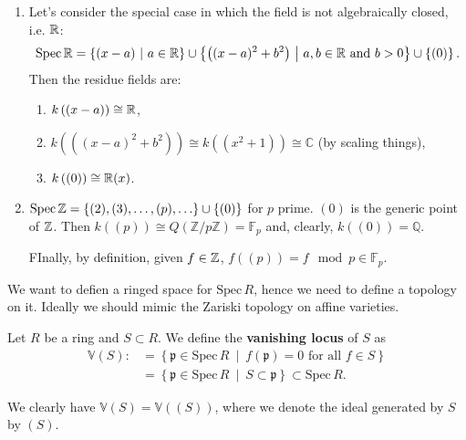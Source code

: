 \begin{ex}
\begin{enumerate}
\item Let's consider the special case in which the field is not algebraically closed, i.e. $\mathbb{R}$:
	\begin{equation}
	\mathrm{Spec}\, \mathbb{R} =
	\left\{ (x-a) \ \middle|\ a \in \mathbb{R} \right\} \cup
	\left\{ \left( (x-a)^2 + b^2 \right) \ \middle|\ a,b \in \mathbb{R} \text{ and } b > 0 \right\} \cup
	\left\{ (0) \right\}
	.\end{equation} 
	Then the residue fields are:
	\begin{enumerate}
		\item $k \left( (x-a) \right) \cong \mathbb{R}$,
		\item $k \left( \left( (x-a)^2 + b^2 \right) \right) \cong
			k \left( (x^2 + 1) \right) \cong \mathbb{C}$ (by scaling things),
		\item $k \left( (0) \right) \cong \mathbb{R}(x)$.
	\end{enumerate}
\item $\mathrm{Spec}\, \mathbb{Z} = \left\{ (2), (3), \ldots, (p), \ldots \right\} \cup \left\{ (0) \right\}$
	for $p$ prime.
	$(0)$ is the generic point of $\mathbb{Z}$.
	Then $k \left( (p) \right) \cong Q \left( \mathbb{Z}/p\mathbb{Z} \right) = \mathbb{F}_p$
	and, clearly, $k \left( (0) \right) = \mathbb{Q}$.

	FInally, by definition, given $f \in \mathbb{Z}$, $f \left( (p) \right) = f \mod p \in \mathbb{F}_p$.
\end{enumerate}
\end{ex} 

We want to defien a ringed space for $\mathrm{Spec}\, R$, hence we need to
define a topology on it. Ideally we should mimic the Zariski topology on affine varieties.

\begin{defn}
	Let $R$ be a ring and $S \subset R$.
	We define the \textbf{vanishing locus} of $S$ as
	\begin{align}
		\mathbb{V}\left( S \right) :&= \left\{ \mathfrak{p} \in \mathrm{Spec}\, R \ \middle|\ 
	f(\mathfrak{p}) = 0 \text{ for all } f \in S \right\}\\
		&= \left\{ \mathfrak{p} \in \mathrm{Spec}\, R \ \middle|\ 
		S \subset \mathfrak{p} \right\} \subset \mathrm{Spec}\, R
	.\end{align} 
\end{defn}

\begin{rem}[]
	We clearly have $\mathbb{V}\left( S \right) = \mathbb{V}\left( (S) \right)$,
	where we denote the ideal generated by $S$ by $(S)$.
\end{rem}

